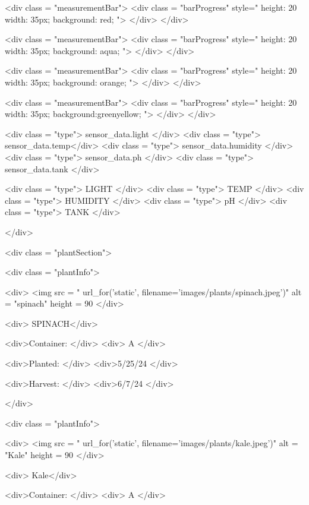 \documentclass[12pt]{article} %
\begin{document}
\begin{htmlcode}[caption={Plant Page HTML}]
     <div class = "measurementBar"> 
      <div class = "barProgress" style="   
      height: 20%
      width: 35px;
      background: red; "> 
      </div>
      </div> 

     <div class = "measurementBar"> 
      <div class = "barProgress" style="   
      height: 20%
      width: 35px;
      background: aqua; "> 
      </div>
      </div> 

     <div class = "measurementBar"> 
      <div class = "barProgress" style="   
      height: 20%
      width: 35px;
      background: orange; "> 
      </div>
      </div> 

     <div class = "measurementBar"> 
      <div class = "barProgress" style="   
      height: 20%
      width: 35px;
      background:greenyellow; "> 
      </div>
      </div> 
 

     <div class = "type"> {{sensor_data.light}} </div>
     <div class = "type"> {{sensor_data.temp}}</div>
     <div class = "type"> {{sensor_data.humidity}} </div>
     <div class = "type"> {{sensor_data.ph}} </div>
     <div class = "type"> {{sensor_data.tank}} </div>

     <div class = "type"> LIGHT </div>
     <div class = "type"> TEMP </div>
     <div class = "type"> HUMIDITY </div>
     <div class = "type"> pH </div>
     <div class = "type"> TANK </div>

     </div>

    <div class = "plantSection">

     <div class = "plantInfo">

      <div>
         <img src = "{{ url_for('static', filename='images/plants/spinach.jpeg')}}" alt = "spinach" height = 90%
      </div>
     
      <div> SPINACH</div>

      <div>Container: </div>
      <div> A </div>

      <div>Planted: </div>
      <div>5/25/24 </div>

      <div>Harvest: </div>
      <div>6/7/24 </div>

     </div>

     <div class = "plantInfo">

      <div>
         <img src = "{{ url_for('static', filename='images/plants/kale.jpeg')}}" alt = "Kale" height = 90%
      </div>
     
      <div> Kale</div>

      <div>Container: </div>
      <div> A </div>


\end{htmlcode}
\end{document}
